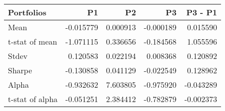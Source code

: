 \begin{tabular}{lrrrr}
\toprule
Portfolios & P1 & P2 & P3 & P3 - P1 \\
\midrule
Mean & -0.015779 & 0.000913 & -0.000189 & 0.015590 \\
t-stat of mean & -1.071115 & 0.336656 & -0.184568 & 1.055596 \\
Stdev & 0.120583 & 0.022194 & 0.008368 & 0.120892 \\
Sharpe & -0.130858 & 0.041129 & -0.022549 & 0.128962 \\
Alpha & -0.932632 & 7.603805 & -0.975920 & -0.043289 \\
t-stat of alpha & -0.051251 & 2.384412 & -0.782879 & -0.002373 \\
\bottomrule
\end{tabular}

